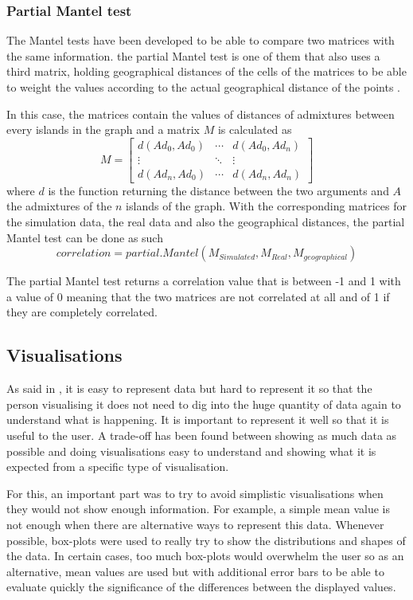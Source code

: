 \documentclass[a4paper,12pt]{report}
\begin{document}
\subsubsection{Partial Mantel test}
The Mantel tests have been developed to be able to compare two matrices with the same information. the partial Mantel test is one of them that also uses a third matrix, holding geographical distances of the cells of the matrices to be able to weight the values according to the actual geographical distance of the points \cite{Smo01}.

In this case, the matrices contain the values of distances of admixtures between every islands in the graph and a matrix $M$ is calculated as
\begin{equation}
	M = \begin{bmatrix}
		d(Ad_0, Ad_0)	& \cdots & d(Ad_0, Ad_n) \\
		\vdots			& \ddots & \vdots		 \\
		d(Ad_n, Ad_0)	& \cdots & d(Ad_n, Ad_n)
	\end{bmatrix}
\end{equation}
where $d$ is the function returning the distance between the two arguments and $A$ the admixtures of the $n$ islands of the graph. With the corresponding matrices for the simulation data, the real data and also the geographical distances, the partial Mantel test can be done as such
\begin{equation}
	correlation = partial.Mantel(M_{Simulated}, M_{Real}, M_{geographical})
\end{equation}

The partial Mantel test returns a correlation value that is between -1 and 1 with a value of 0 meaning that the two matrices are not correlated at all and of 1 if they are completely correlated.

\subsection{Visualisations}
As said in \cite{Wei01}, it is easy to represent data but hard to represent it so that the person visualising it does not need to dig into the huge quantity of data again to understand what is happening. It is important to represent it well so that it is useful to the user. A trade-off has been found between showing as much data as possible and doing visualisations easy to understand and showing what it is expected from a specific type of visualisation.

For this, an important part was to try to avoid simplistic visualisations when they would not show enough information. For example, a simple mean value is not enough when there are alternative ways to represent this data. Whenever possible, box-plots were used to really try to show the distributions and shapes of the data. In certain cases, too much box-plots would overwhelm the user so as an alternative, mean values are used but with additional error bars to be able to evaluate quickly the significance of the differences between the displayed values.
\end{document}

